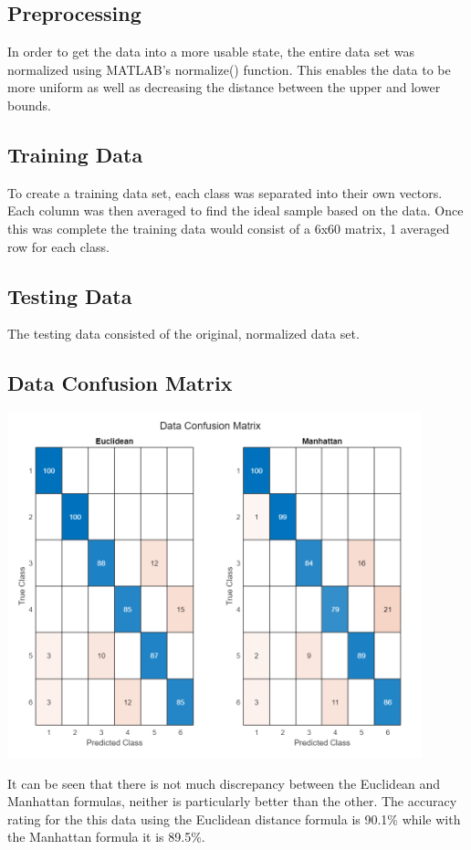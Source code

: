 \documentclass{article}
\begin{document}
\subsection{Preprocessing}

In order to get the data into a more usable state, the entire data set was
normalized using MATLAB's normalize() function.  This enables the data to 
be more uniform as well as decreasing the distance between the upper and 
lower bounds.

\subsection{Training Data}
To create a training data set, each class was separated into their own vectors.
Each column was then averaged to find the ideal sample based on the data.  Once 
this was complete the training data would consist of a 6x60 matrix, 1 averaged
row for each class.

\subsection{Testing Data}
The testing data consisted of the original, normalized data set.

\subsection{Data Confusion Matrix}
\begin{center}
    {\includegraphics[height=10cm]{graphics/confuseddata.png}\centering}
\end{center}    
It can be seen that there is not much discrepancy between the Euclidean 
and Manhattan formulas, neither is particularly better than the other.
The accuracy rating for the this data using the Euclidean distance formula
is 90.1\% while with the Manhattan formula it is 89.5\%.
\end{document}
